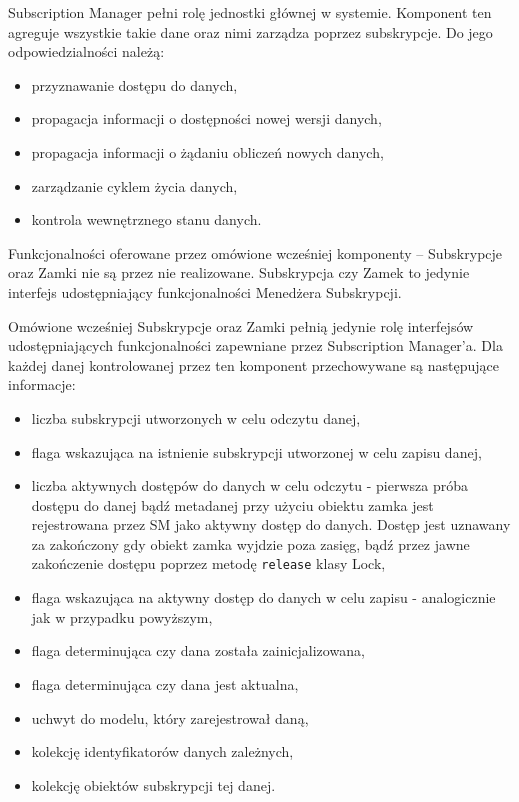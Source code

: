 Subscription Manager pełni rolę jednostki głównej w systemie. Komponent ten agreguje wszystkie takie dane oraz nimi zarządza poprzez subskrypcje. Do jego odpowiedzialności należą:
\begin{itemize}
	\item przyznawanie dostępu do danych,
	\item propagacja informacji o dostępności nowej wersji danych,
	\item propagacja informacji o żądaniu obliczeń nowych danych,
	\item zarządzanie cyklem życia danych,
	\item kontrola wewnętrznego stanu danych.
\end{itemize}

Funkcjonalności oferowane przez omówione wcześniej komponenty -- Subskrypcje oraz Zamki nie są przez nie realizowane. Subskrypcja czy Zamek to jedynie interfejs udostępniający funkcjonalności Menedżera Subskrypcji. 

Omówione wcześniej Subskrypcje oraz Zamki pełnią jedynie rolę interfejsów udostępniających funkcjonalności zapewniane przez Subscription Manager'a. Dla każdej danej kontrolowanej przez ten komponent przechowywane są następujące informacje:
\begin{itemize}
	\item liczba subskrypcji utworzonych w celu odczytu danej,
	\item flaga wskazująca na istnienie subskrypcji utworzonej w celu zapisu danej,
	\item liczba aktywnych dostępów do danych w celu odczytu - pierwsza próba dostępu do danej bądź metadanej przy użyciu obiektu zamka jest rejestrowana przez SM jako aktywny dostęp do danych. Dostęp jest uznawany za zakończony gdy obiekt zamka wyjdzie poza zasięg, bądź przez jawne zakończenie dostępu poprzez metodę \lstinline$release$ klasy Lock,
	\item flaga wskazująca na aktywny dostęp do danych w celu zapisu - analogicznie jak w przypadku powyższym,
	\item flaga determinująca czy dana została zainicjalizowana,
	\item flaga determinująca czy dana jest aktualna,
	\item uchwyt do modelu, który zarejestrował daną,
	\item kolekcję identyfikatorów danych zależnych,
	\item kolekcję obiektów subskrypcji tej danej.
\end{itemize}


